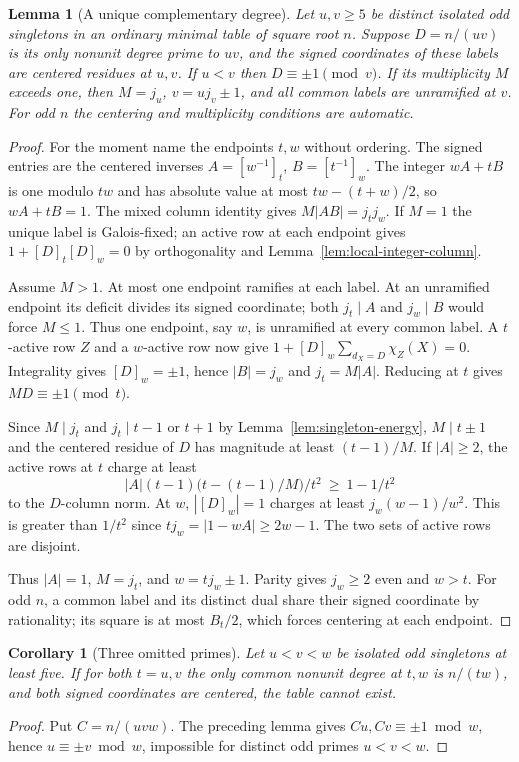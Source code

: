 \documentclass[11pt,a4paper]{article}
\numberwithin{equation}{section}
\newtheorem{lemma}[theorem]{Lemma}
\newtheorem{corollary}[theorem]{Corollary}
\theoremstyle{remark}
\begin{document}
\begin{lemma}[A unique complementary degree]\label{fam:M:8.9}\label{seq:five-larger}\label{new:only-common-pair}
Let $u,v\ge5$ be distinct isolated odd singletons in an ordinary
minimal table of square root $n$. Suppose $D=n/(uv)$ is its only
nonunit degree prime to $uv$, and the signed coordinates of these
labels are centered residues at $u,v$. If $u<v$ then
$D\equiv\pm1\pmod v$. If its multiplicity $M$ exceeds one, then
$M=j_u$, $v=uj_v\pm1$, and all common labels are unramified at $v$.
For odd $n$ the centering and multiplicity conditions are automatic.
\end{lemma}
\begin{proof}
For the moment name the endpoints $t,w$ without ordering. The signed
entries are the centered inverses $A=[w^{-1}]_t$, $B=[t^{-1}]_w$.
The integer $wA+tB$ is one modulo $tw$ and has absolute value at most
$tw-(t+w)/2$, so $wA+tB=1$. The mixed column identity gives
$M|AB|=j_tj_w$. If $M=1$ the unique label is Galois-fixed; an active
row at each endpoint gives $1+[D]_t[D]_w=0$ by orthogonality and
Lemma~\ref{lem:local-integer-column}.

Assume $M>1$. At most one endpoint ramifies at each label. At an
unramified endpoint its deficit divides its signed coordinate; both
$j_t\mid A$ and $j_w\mid B$ would force $M\le1$. Thus one endpoint,
say $w$, is unramified at every common label. A $t$-active row $Z$ and a
$w$-active row now give $1+[D]_w\sum_{d_X=D}\chi_Z(X)=0$.
Integrality gives $[D]_w=\pm1$, hence $|B|=j_w$ and $j_t=M|A|$.
Reducing at $t$ gives $MD\equiv\pm1\pmod t$.

Since $M\mid j_t$ and $j_t\mid t-1$ or $t+1$ by
Lemma~\ref{lem:singleton-energy}, $M\mid t\pm1$ and the
centered residue of $D$ has magnitude at least $(t-1)/M$.
If $|A|\ge2$, the active rows at $t$ charge at least
\[
   |A|(t-1)\bigl(t-(t-1)/M\bigr)/t^2\ \ge\ 1-1/t^2
\]
to the $D$-column norm. At $w$, $|[D]_w|=1$ charges at least
$j_w(w-1)/w^2$. This is greater than $1/t^2$ since
$tj_w=|1-wA|\ge2w-1$. The two sets of active rows are disjoint.

Thus $|A|=1$,
$M=j_t$, and $w=tj_w\pm1$. Parity gives $j_w\ge2$ even and $w>t$.
For odd $n$, a common label and its distinct dual share their signed
coordinate by rationality; its square is at most $B_t/2$, which
forces centering at each endpoint.
\end{proof}

\begin{corollary}[Three omitted primes]\label{fam:M:8.10}\label{lem:singleton-triple}
Let $u<v<w$ be isolated odd singletons at least five. If for both
$t=u,v$ the only common nonunit degree at $t,w$ is $n/(tw)$,
and both signed coordinates are centered, the table cannot exist.
\end{corollary}
\begin{proof}
Put $C=n/(uvw)$. The preceding lemma gives
$Cu,Cv\equiv\pm1\bmod w$, hence $u\equiv\pm v\bmod w$,
impossible for distinct odd primes $u<v<w$.
\end{proof}
\end{document}
